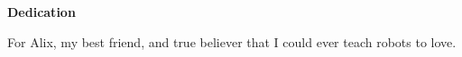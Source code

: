 
\begin{center}

\vspace*{5\baselineskip}
\textbf{\large Dedication}
\end{center}

For Alix, my best friend, and true believer that I could ever teach robots
to love.

